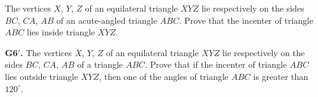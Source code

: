 The vertices $X$, $Y$, $Z$ of an equilateral triangle $XYZ$ lie respectively on the sides $BC$, $CA$, $AB$ of an acute-angled triangle $ABC$. Prove that the incenter of triangle $ABC$ lies inside triangle $XYZ$.

\medskip

\textbf{G6$'$.} The vertices $X$, $Y$, $Z$ of an equilateral triangle $XYZ$ lie respectively on the sides $BC$, $CA$, $AB$ of a triangle $ABC$. Prove that if the incenter of triangle $ABC$ lies outside triangle $XYZ$, then one of the angles of triangle $ABC$ is greater than $120^\circ$.
